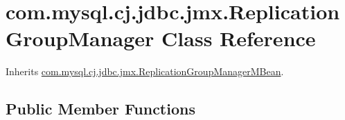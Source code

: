 \hypertarget{classcom_1_1mysql_1_1cj_1_1jdbc_1_1jmx_1_1_replication_group_manager}{}\section{com.\+mysql.\+cj.\+jdbc.\+jmx.\+Replication\+Group\+Manager Class Reference}
\label{classcom_1_1mysql_1_1cj_1_1jdbc_1_1jmx_1_1_replication_group_manager}


Inherits \mbox{\hyperlink{interfacecom_1_1mysql_1_1cj_1_1jdbc_1_1jmx_1_1_replication_group_manager_m_bean}{com.\+mysql.\+cj.\+jdbc.\+jmx.\+Replication\+Group\+Manager\+M\+Bean}}.

\subsection*{Public Member Functions}
